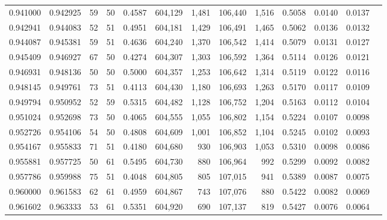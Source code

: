 \begin{tabular}{rrrrrrrrrrrrr}
0.941000 & 0.942925 &    59 &  50 &                                     0.4587 & 604,129 &   1,481 & 106,440 &   1,516 & 0.5058 & 0.0140 & 0.0137 \\
0.942941 & 0.944083 &    52 &  51 &                                     0.4951 & 604,181 &   1,429 & 106,491 &   1,465 & 0.5062 & 0.0136 & 0.0132 \\
0.944087 & 0.945381 &    59 &  51 &                                     0.4636 & 604,240 &   1,370 & 106,542 &   1,414 & 0.5079 & 0.0131 & 0.0127 \\
0.945409 & 0.946927 &    67 &  50 &                                     0.4274 & 604,307 &   1,303 & 106,592 &   1,364 & 0.5114 & 0.0126 & 0.0121 \\
0.946931 & 0.948136 &    50 &  50 &                                     0.5000 & 604,357 &   1,253 & 106,642 &   1,314 & 0.5119 & 0.0122 & 0.0116 \\
0.948145 & 0.949761 &    73 &  51 &                                     0.4113 & 604,430 &   1,180 & 106,693 &   1,263 & 0.5170 & 0.0117 & 0.0109 \\
0.949794 & 0.950952 &    52 &  59 &                                     0.5315 & 604,482 &   1,128 & 106,752 &   1,204 & 0.5163 & 0.0112 & 0.0104 \\
0.951024 & 0.952698 &    73 &  50 &                                     0.4065 & 604,555 &   1,055 & 106,802 &   1,154 & 0.5224 & 0.0107 & 0.0098 \\
0.952726 & 0.954106 &    54 &  50 &                                     0.4808 & 604,609 &   1,001 & 106,852 &   1,104 & 0.5245 & 0.0102 & 0.0093 \\
0.954167 & 0.955833 &    71 &  51 &                                     0.4180 & 604,680 &     930 & 106,903 &   1,053 & 0.5310 & 0.0098 & 0.0086 \\
0.955881 & 0.957725 &    50 &  61 &                                     0.5495 & 604,730 &     880 & 106,964 &     992 & 0.5299 & 0.0092 & 0.0082 \\
0.957786 & 0.959988 &    75 &  51 &                                     0.4048 & 604,805 &     805 & 107,015 &     941 & 0.5389 & 0.0087 & 0.0075 \\
0.960000 & 0.961583 &    62 &  61 &                                     0.4959 & 604,867 &     743 & 107,076 &     880 & 0.5422 & 0.0082 & 0.0069 \\
0.961602 & 0.963333 &    53 &  61 &                                     0.5351 & 604,920 &     690 & 107,137 &     819 & 0.5427 & 0.0076 & 0.0064 \\

\end{tabular}
